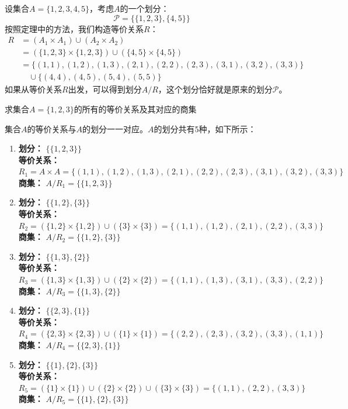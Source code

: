 \documentclass[lang=cn,11pt]{elegantbook}
\begin{document}
设集合$A = \{1, 2, 3, 4, 5\}$，考虑$A$的一个划分：
\[
\mathcal{P} = \{\{1, 2, 3\}, \{4, 5\}\}
\]
按照定理中的方法，我们构造等价关系$R$：
\begin{align*}
R &= (A_1 \times A_1) \cup (A_2 \times A_2) \\
  &= (\{1,2,3\} \times \{1,2,3\}) \cup (\{4,5\} \times \{4,5\}) \\
  &= \{(1,1),(1,2),(1,3),(2,1),(2,2),(2,3),(3,1),(3,2),(3,3)\} \\
  &\quad \cup \{(4,4),(4,5),(5,4),(5,5)\}
\end{align*}
如果从等价关系$R$出发，可以得到划分$A/R$，这个划分恰好就是原来的划分$\mathcal{P}$。
\begin{example}[写出一个集合所有的等价关系]
    求集合$A = \{1, 2, 3\}$的所有的等价关系及其对应的商集
\end{example}
集合$A$的等价关系与$A$的划分一一对应。$A$的划分共有5种，如下所示：
\begin{enumerate}
    \item \textbf{划分：} $\{\{1,2,3\}\}$ \\
          \textbf{等价关系：} $R_1 = A \times A = \{(1,1),(1,2),(1,3),(2,1),(2,2),(2,3),(3,1),(3,2),(3,3)\}$ \\
          \textbf{商集：} $A/R_1 = \{\{1,2,3\}\}$

    \item \textbf{划分：} $\{\{1,2\}, \{3\}\}$ \\
          \textbf{等价关系：} $R_2 = (\{1,2\} \times \{1,2\}) \cup (\{3\} \times \{3\}) = \{(1,1),(1,2),(2,1),(2,2),(3,3)\}$ \\
          \textbf{商集：} $A/R_2 = \{\{1,2\}, \{3\}\}$

    \item \textbf{划分：} $\{\{1,3\}, \{2\}\}$ \\
          \textbf{等价关系：} $R_3 = (\{1,3\} \times \{1,3\}) \cup (\{2\} \times \{2\})= \{(1,1),(1,3),(3,1),(3,3),(2,2)\}$ \\
          \textbf{商集：} $A/R_3 = \{\{1,3\}, \{2\}\}$

    \item \textbf{划分：} $\{\{2,3\}, \{1\}\}$ \\
          \textbf{等价关系：} $R_4 = (\{2,3\} \times \{2,3\}) \cup (\{1\} \times \{1\})= \{(2,2),(2,3),(3,2),(3,3),(1,1)\}$ \\
          \textbf{商集：} $A/R_4 = \{\{2,3\}, \{1\}\}$

    \item \textbf{划分：} $\{\{1\}, \{2\}, \{3\}\}$ \\
          \textbf{等价关系：} $R_5 = (\{1\} \times \{1\}) \cup (\{2\} \times \{2\}) \cup (\{3\} \times \{3\})= \{(1,1),(2,2),(3,3)\}$ \\
          \textbf{商集：} $A/R_5 = \{\{1\}, \{2\}, \{3\}\}$
\end{enumerate}
\end{document}
